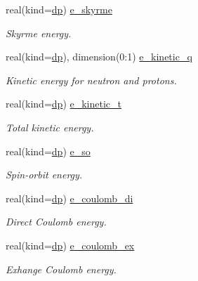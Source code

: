 \begin{DoxyCompactItemize}
real(kind=\mbox{\hyperlink{namespaceparameters_a52f8c6351fd79345d8811e065bcbbb37}{dp}}) \mbox{\hyperlink{group__WS__PROPERTIES_ga5683bdc3d77765f0e39d27c0a8c07e12}{e\+\_\+skyrme}}
\begin{DoxyCompactList}\small\item\em Skyrme energy. \end{DoxyCompactList}\item 
real(kind=\mbox{\hyperlink{namespaceparameters_a52f8c6351fd79345d8811e065bcbbb37}{dp}}), dimension(0\+:1) \mbox{\hyperlink{group__WS__PROPERTIES_ga488ae2b962fd84ebc096feb2d9b86bdb}{e\+\_\+kinetic\+\_\+q}}
\begin{DoxyCompactList}\small\item\em Kinetic energy for neutron and protons. \end{DoxyCompactList}\item 
real(kind=\mbox{\hyperlink{namespaceparameters_a52f8c6351fd79345d8811e065bcbbb37}{dp}}) \mbox{\hyperlink{group__WS__PROPERTIES_ga6a028c7097c7f19416111f67d7751e0a}{e\+\_\+kinetic\+\_\+t}}
\begin{DoxyCompactList}\small\item\em Total kinetic energy. \end{DoxyCompactList}\item 
real(kind=\mbox{\hyperlink{namespaceparameters_a52f8c6351fd79345d8811e065bcbbb37}{dp}}) \mbox{\hyperlink{group__WS__PROPERTIES_ga1be7ac7adf47738e0cf4ada759e3b038}{e\+\_\+so}}
\begin{DoxyCompactList}\small\item\em Spin-\/orbit energy. \end{DoxyCompactList}\item 
real(kind=\mbox{\hyperlink{namespaceparameters_a52f8c6351fd79345d8811e065bcbbb37}{dp}}) \mbox{\hyperlink{group__WS__PROPERTIES_gad3cbae007568a7ca3045ba174fda13e0}{e\+\_\+coulomb\+\_\+di}}
\begin{DoxyCompactList}\small\item\em Direct Coulomb energy. \end{DoxyCompactList}\item 
real(kind=\mbox{\hyperlink{namespaceparameters_a52f8c6351fd79345d8811e065bcbbb37}{dp}}) \mbox{\hyperlink{group__WS__PROPERTIES_ga089d9dd6556d4555570eed570f9f71f3}{e\+\_\+coulomb\+\_\+ex}}
\begin{DoxyCompactList}\small\item\em Exhange Coulomb energy. \end{DoxyCompactList}\item 

\end{DoxyCompactItemize}
